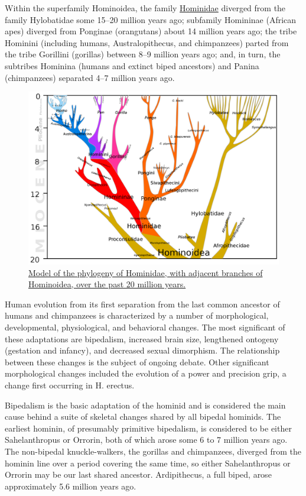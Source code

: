 Within the superfamily Hominoidea, the family \href{https://en.wikipedia.org/wiki/Hominidae}{Hominidae} diverged from the family Hylobatidae some 15--20 million years ago; subfamily Homininae (African apes) diverged from Ponginae (orangutans) about 14 million years ago; the tribe Hominini (including humans, Australopithecus, and chimpanzees) parted from the tribe Gorillini (gorillas) between 8--9 million years ago; and, in turn, the subtribes Hominina (humans and extinct biped ancestors) and Panina (chimpanzees) separated 4--7 million years ago.



\begin{figure}

{\centering \includegraphics[width=0.7\linewidth]{./figures/animals/Hominoidea_lineage} 

}

\caption{\href{https://commons.wikimedia.org/wiki/File:Hominoidea_lineage.svg}{Model of the phylogeny of Hominidae, with adjacent branches of Hominoidea, over the past 20 million years.}}\label{fig:phylogenyhominidae}
\end{figure}

Human evolution from its first separation from the last common ancestor of humans and chimpanzees is characterized by a number of morphological, developmental, physiological, and behavioral changes. The most significant of these adaptations are bipedalism, increased brain size, lengthened ontogeny (gestation and infancy), and decreased sexual dimorphism. The relationship between these changes is the subject of ongoing debate. Other significant morphological changes included the evolution of a power and precision grip, a change first occurring in H. erectus.

Bipedalism is the basic adaptation of the hominid and is considered the main cause behind a suite of skeletal changes shared by all bipedal hominids. The earliest hominin, of presumably primitive bipedalism, is considered to be either Sahelanthropus or Orrorin, both of which arose some 6 to 7 million years ago. The non-bipedal knuckle-walkers, the gorillas and chimpanzees, diverged from the hominin line over a period covering the same time, so either Sahelanthropus or Orrorin may be our last shared ancestor. Ardipithecus, a full biped, arose approximately 5.6 million years ago.



